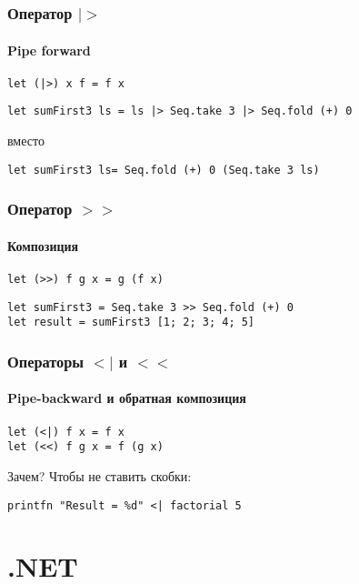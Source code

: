 \documentclass[xetex,mathserif,serif]{beamer}
\begin{document}
    \begin{frame}[fragile]
        \frametitle{Оператор $|>$}
        \framesubtitle{Pipe forward}
        \begin{verbatim}
let (|>) x f = f x
        \end{verbatim}

        \begin{verbatim}
let sumFirst3 ls = ls |> Seq.take 3 |> Seq.fold (+) 0
        \end{verbatim}
        вместо
        \begin{verbatim}
let sumFirst3 ls= Seq.fold (+) 0 (Seq.take 3 ls)
        \end{verbatim}
    \end{frame}

    \begin{frame}[fragile]
        \frametitle{Оператор $>>$}
        \framesubtitle{Композиция}
        \begin{verbatim}
let (>>) f g x = g (f x)
        \end{verbatim}
        \begin{verbatim}
let sumFirst3 = Seq.take 3 >> Seq.fold (+) 0
let result = sumFirst3 [1; 2; 3; 4; 5]
        \end{verbatim}
    \end{frame}

    \begin{frame}[fragile]
        \frametitle{Операторы $<|$ и $<<$}
        \framesubtitle{Pipe-backward и обратная композиция}
        \begin{verbatim}
let (<|) f x = f x
let (<<) f g x = f (g x)
        \end{verbatim}
        Зачем? Чтобы не ставить скобки:
        \begin{verbatim}
printfn "Result = %d" <| factorial 5
        \end{verbatim}
    \end{frame}

    \section{.NET}
\end{document}
